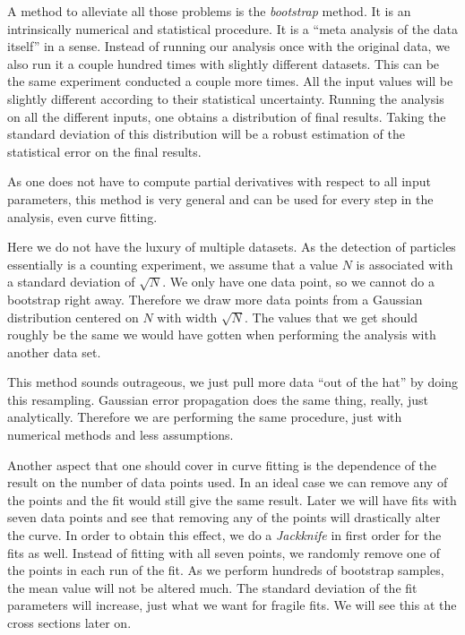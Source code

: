 \documentclass[11pt, english, fleqn, DIV=15, headinclude, BCOR=2cm]{scrreprt}
\begin{document}
A method to alleviate all those problems is the \emph{bootstrap} method. It is
an intrinsically numerical and statistical procedure. It is a \enquote{meta
analysis of the data itself} in a sense. Instead of running our analysis once
with the original data, we also run it a couple hundred times with slightly
different datasets. This can be the same experiment conducted a couple more
times. All the input values will be slightly different according to their
statistical uncertainty. Running the analysis on all the different inputs, one
obtains a distribution of final results. Taking the standard deviation of this
distribution will be a robust estimation of the statistical error on the final
results.

As one does not have to compute partial derivatives with respect to all input
parameters, this method is very general and can be used for every step in the
analysis, even curve fitting.

Here we do not have the luxury of multiple datasets. As the detection of
particles essentially is a counting experiment, we assume that a value $N$ is
associated with a standard deviation of $\sqrt N$. We only have one data point,
so we cannot do a bootstrap right away. Therefore we draw more data points from
a Gaussian distribution centered on $N$ with width $\sqrt N$. The values that
we get should roughly be the same we would have gotten when performing the
analysis with another data set.

This method sounds outrageous, we just pull more data \enquote{out of the hat}
by doing this resampling. Gaussian error propagation does the same thing,
really, just analytically. Therefore we are performing the same procedure, just
with numerical methods and less assumptions.

Another aspect that one should cover in curve fitting is the dependence of the
result on the number of data points used. In an ideal case we can remove any of
the points and the fit would still give the same result. Later we will have
fits with seven data points and see that removing any of the points will
drastically alter the curve. In order to obtain this effect, we do a
\emph{Jackknife} in first order for the fits as well. Instead of fitting with
all seven points, we randomly remove one of the points in each run of the fit.
As we perform hundreds of bootstrap samples, the mean value will not be altered
much. The standard deviation of the fit parameters will increase, just what we
want for fragile fits. We will see this at the cross sections later on.
\end{document}

